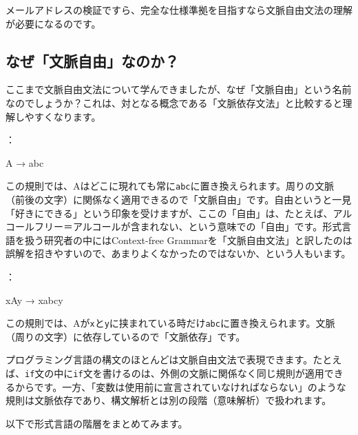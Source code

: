 メールアドレスの検証ですら、完全な仕様準拠を目指すなら文脈自由文法の理解が必要になるのです。

\subsection{なぜ「文脈自由」なのか？}

ここまで文脈自由文法について学んできましたが、なぜ「文脈自由」という名前なのでしょうか？これは、対となる概念である「文脈依存文法」と比較すると理解しやすくなります。

\bigskip
\noindent{}：

\begin{codescreen}{}
A → abc
\end{codescreen}

この規則では、Aはどこに現れても常に\texttt{abc}に置き換えられます。周りの文脈（前後の文字）に関係なく適用できるので「文脈自由」です。自由というと一見「好きにできる」という印象を受けますが、ここの「自由」は、たとえば、アルコールフリー＝アルコールが含まれない、という意味での「自由」です。形式言語を扱う研究者の中にはContext-free Grammarを「文脈自由文法」と訳したのは誤解を招きやすいので、あまりよくなかったのではないか、という人もいます。

\bigskip
\noindent{}：

\begin{codescreen}{}
xAy → xabcy
\end{codescreen}

この規則では、Aが\texttt{x}と\texttt{y}に挟まれている時だけ\texttt{abc}に置き換えられます。文脈（周りの文字）に依存しているので「文脈依存」です。

プログラミング言語の構文のほとんどは文脈自由文法で表現できます。たとえば、\texttt{if}文の中に\texttt{if}文を書けるのは、外側の文脈に関係なく同じ規則が適用できるからです。一方、「変数は使用前に宣言されていなければならない」のような規則は文脈依存であり、構文解析とは別の段階（意味解析）で扱われます。

以下で形式言語の階層をまとめてみます。

